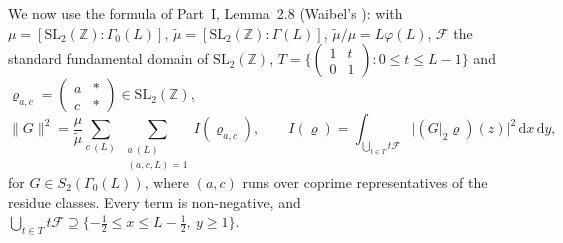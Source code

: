 ﻿\documentclass[11pt]{amsart}
\theoremstyle{remark}
\newcommand{\Z}{\mathbb{Z}}
\newcommand{\cF}{\mathcal{F}}
\newcommand{\dd}{\mathrm{d}}
\begin{document}
We now use the formula of Part~I, Lemma~2.8 (Waibel's \cite[(22)]{Waibel}): with $\mu=[\mathrm{SL}_2(\Z):\Gamma_0(L)]$, $\tilde\mu=[\mathrm{SL}_2(\Z):\Gamma(L)]$, $\tilde\mu/\mu=L\varphi(L)$, $\cF$ the standard fundamental domain of $\mathrm{SL}_2(\Z)$, $T=\{\left(\begin{smallmatrix}1&t\\0&1\end{smallmatrix}\right):0\le t\le L-1\}$ and $\varrho_{a,c}=\left(\begin{smallmatrix}a&*\\c&*\end{smallmatrix}\right)\in\mathrm{SL}_2(\Z)$,
\begin{equation}\label{eq:W1}
\|G\|^2=\frac{\mu}{\tilde\mu}\sum_{c\ (L)}\ \sum_{\substack{a\ (L)\\ (a,c,L)=1}}I(\varrho_{a,c}),\qquad I(\varrho)=\int_{\bigcup_{t\in T}t\cF}\bigl|(G|_2\varrho)(z)\bigr|^2\,\dd x\,\dd y ,
\end{equation}
for $G\in S_2(\Gamma_0(L))$, where $(a,c)$ runs over coprime representatives of the residue classes. Every term is non-negative, and $\bigcup_{t\in T}t\cF\supseteq\{-\tfrac12\le x\le L-\tfrac12,\ y\ge1\}$.
\end{document}
